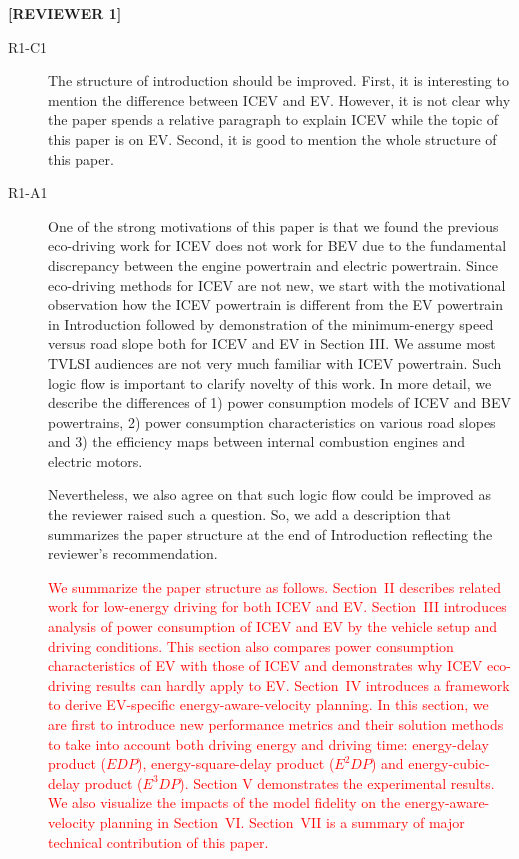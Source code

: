 \documentclass[onecolumn]{IEEEconf}
\begin{document}
\setlength{\parindent}{0cm}
\textbf{[REVIEWER 1]}
\begin{description}
\item [R1-C1] The structure of introduction should be improved. First, it is interesting to mention the difference between ICEV and EV. However, it is not clear why the paper spends a relative paragraph to explain ICEV while the topic of this paper is on EV. Second, it is good to mention the whole structure of this paper.
 
\item [R1-A1] One of the strong motivations of this paper is that we found the previous eco-driving work for ICEV does not work for BEV due to the fundamental discrepancy between the engine powertrain and electric powertrain. Since eco-driving methods for ICEV are not new, we start with the motivational observation how the ICEV powertrain is different from the EV powertrain in Introduction followed by demonstration of the minimum-energy speed versus road slope both for ICEV and EV in Section III. We assume most TVLSI audiences are not very much familiar with ICEV powertrain. Such logic flow is important to clarify novelty of this work. In more detail,  we describe the differences of 1) power consumption models of ICEV and BEV powertrains, 2) power consumption characteristics on various road slopes and 3) the efficiency maps between internal combustion engines and electric motors.  

Nevertheless, we also agree on that such logic flow could be improved as the reviewer raised such a question. So, we add a description that summarizes the paper structure at the end of Introduction reflecting the reviewer's recommendation.

\textcolor{red}{We summarize the paper structure as follows. Section~II describes related work for low-energy driving for both ICEV and EV. Section~III introduces analysis of power consumption of ICEV and EV  by the vehicle setup and driving conditions. This section also compares power consumption characteristics of EV with those of ICEV and demonstrates why  ICEV eco-driving results can hardly apply to EV. Section~IV introduces a framework to derive EV-specific energy-aware-velocity planning. In this section, we are first to introduce new performance metrics and their solution methods to take into account both driving energy and driving time: energy-delay product ($EDP$), energy-square-delay product ($E^2DP$) and energy-cubic-delay product ($E^3DP$). Section V demonstrates the experimental results. 
We also visualize the impacts of the model fidelity on the energy-aware-velocity planning in Section~VI. Section~VII is a summary of major technical contribution of this paper.}\\



\end{description}
\end{document}
